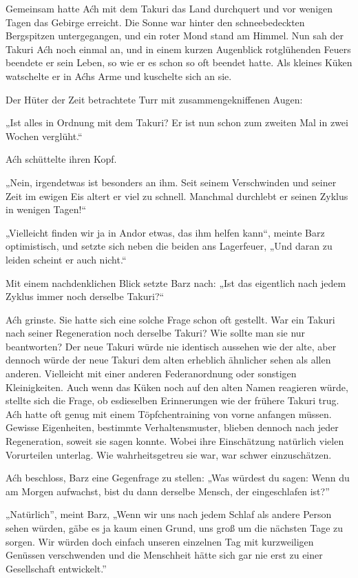 \trennzeichen



Gemeinsam hatte Aćh mit dem Takuri das Land durchquert und vor wenigen Tagen das Gebirge erreicht. Die Sonne war hinter den schneebedeckten Bergspitzen untergegangen, und ein roter Mond stand am Himmel. Nun sah der Takuri Aćh noch einmal an, und in einem kurzen Augenblick rotglühenden Feuers beendete er sein Leben, so wie er es schon so oft beendet hatte. Als kleines Küken watschelte er in Aćhs Arme und kuschelte sich an sie.

Der Hüter der Zeit betrachtete Turr mit zusammengekniffenen Augen:

„Ist alles in Ordnung mit dem Takuri? Er ist nun schon zum zweiten Mal in zwei Wochen verglüht.“

Aćh schüttelte ihren Kopf.

„Nein, irgendetwas ist besonders an ihm. Seit seinem Verschwinden und seiner Zeit im ewigen Eis altert er viel zu schnell. Manchmal durchlebt er seinen Zyklus in wenigen Tagen!“

„Vielleicht finden wir ja in Andor etwas, das ihm helfen kann“, meinte Barz optimistisch, und setzte sich neben die beiden ans Lagerfeuer, „Und daran zu leiden scheint er auch nicht.“

Mit einem nachdenklichen Blick setzte Barz nach: „Ist das eigentlich nach jedem Zyklus immer noch derselbe Takuri?“

Aćh grinste. Sie hatte sich eine solche Frage schon oft gestellt. War ein Takuri nach seiner Regeneration noch derselbe Takuri? Wie sollte man sie nur beantworten? Der neue Takuri würde nie identisch aussehen wie der alte, aber dennoch würde der neue Takuri dem alten erheblich ähnlicher sehen als allen anderen. Vielleicht mit einer anderen Federanordnung oder sonstigen Kleinigkeiten. Auch wenn das Küken noch auf den alten Namen reagieren würde, stellte sich die Frage, ob esdieselben Erinnerungen wie der frühere Takuri trug. Aćh hatte oft genug mit einem Töpfchentraining von vorne anfangen müssen. Gewisse Eigenheiten, bestimmte Verhaltensmuster, blieben dennoch nach jeder Regeneration, soweit sie sagen konnte. Wobei ihre Einschätzung natürlich vielen Vorurteilen unterlag. Wie wahrheitsgetreu sie war, war schwer einzuschätzen.

Aćh beschloss, Barz eine Gegenfrage zu stellen: „Was würdest du sagen: Wenn du am Morgen aufwachst, bist du dann derselbe Mensch, der eingeschlafen ist?”

„Natürlich”, meint Barz, „Wenn wir uns nach jedem Schlaf als andere Person sehen würden, gäbe es ja kaum einen Grund, uns groß um die nächsten Tage zu sorgen. Wir würden doch einfach unseren einzelnen Tag mit kurzweiligen Genüssen verschwenden und die Menschheit hätte sich gar nie erst zu einer Gesellschaft entwickelt.”

